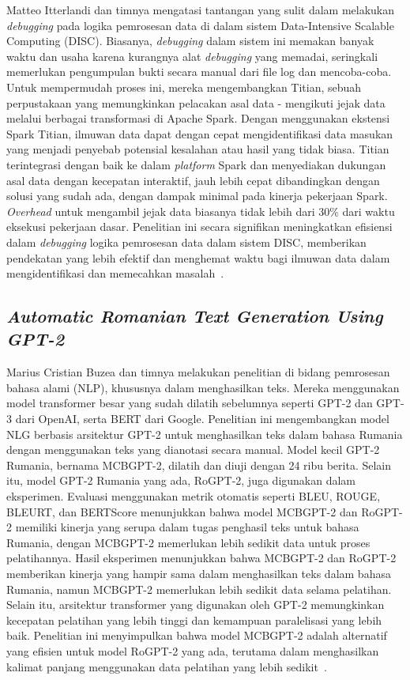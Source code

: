 Matteo Itterlandi dan timnya mengatasi tantangan yang sulit dalam melakukan \emph{debugging} pada logika pemrosesan data di dalam sistem Data-Intensive Scalable Computing (DISC). Biasanya, \emph{debugging} dalam sistem ini memakan banyak waktu dan usaha karena kurangnya alat \emph{debugging} yang memadai, seringkali memerlukan pengumpulan bukti secara manual dari file log dan mencoba-coba. Untuk mempermudah proses ini, mereka mengembangkan Titian, sebuah perpustakaan yang memungkinkan pelacakan asal data - mengikuti jejak data melalui berbagai transformasi di Apache Spark. Dengan menggunakan ekstensi Spark Titian, ilmuwan data dapat dengan cepat mengidentifikasi data masukan yang menjadi penyebab potensial kesalahan atau hasil yang tidak biasa. Titian terintegrasi dengan baik ke dalam \emph{platform} Spark dan menyediakan dukungan asal data dengan kecepatan interaktif, jauh lebih cepat dibandingkan dengan solusi yang sudah ada, dengan dampak minimal pada kinerja pekerjaan Spark. \emph{Overhead} untuk mengambil jejak data biasanya tidak lebih dari 30\% dari waktu eksekusi pekerjaan dasar. Penelitian ini secara signifikan meningkatkan efisiensi dalam \emph{debugging} logika pemrosesan data dalam sistem DISC, memberikan pendekatan yang lebih efektif dan menghemat waktu bagi ilmuwan data dalam mengidentifikasi dan memecahkan masalah~\cite{interlandi2015}.

\subsection{\emph{Automatic Romanian Text Generation Using GPT-2}}
\label{subsec:Automatic Romanian Text Generation Using GPT-2}

Marius Cristian Buzea dan timnya melakukan penelitian di bidang pemrosesan bahasa alami (NLP), khususnya dalam menghasilkan teks. Mereka menggunakan model transformer besar yang sudah dilatih sebelumnya seperti GPT-2 dan GPT-3 dari OpenAI, serta BERT dari Google. Penelitian ini mengembangkan model NLG berbasis arsitektur GPT-2 untuk menghasilkan teks dalam bahasa Rumania dengan menggunakan teks yang dianotasi secara manual. Model kecil GPT-2 Rumania, bernama MCBGPT-2, dilatih dan diuji dengan 24 ribu berita. Selain itu, model GPT-2 Rumania yang ada, RoGPT-2, juga digunakan dalam eksperimen. Evaluasi menggunakan metrik otomatis seperti BLEU, ROUGE, BLEURT, dan BERTScore menunjukkan bahwa model MCBGPT-2 dan RoGPT-2 memiliki kinerja yang serupa dalam tugas penghasil teks untuk bahasa Rumania, dengan MCBGPT-2 memerlukan lebih sedikit data untuk proses pelatihannya. Hasil eksperimen menunjukkan bahwa MCBGPT-2 dan RoGPT-2 memberikan kinerja yang hampir sama dalam menghasilkan teks dalam bahasa Rumania, namun MCBGPT-2 memerlukan lebih sedikit data selama pelatihan. Selain itu, arsitektur transformer yang digunakan oleh GPT-2 memungkinkan kecepatan pelatihan yang lebih tinggi dan kemampuan paralelisasi yang lebih baik. Penelitian ini menyimpulkan bahwa model MCBGPT-2 adalah alternatif yang efisien untuk model RoGPT-2 yang ada, terutama dalam menghasilkan kalimat panjang menggunakan data pelatihan yang lebih sedikit~\cite{buzea2022}.

